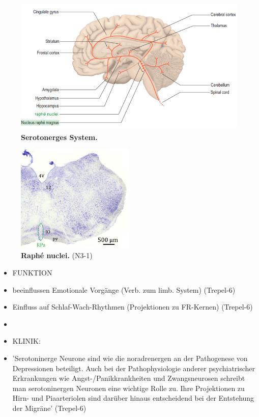 \documentclass[12pt,a4paper,pdftex]{article}
\begin{document}
\begin{figure}[H]
    \centering
    \includegraphics[width=\textwidth]{pictures/Bilder_monoamine_systeme/serotonerges_system.PNG}
    \caption[Serotonerges System]{\textbf{Serotonerges System.} \textsuperscript{\cite[9]{crossman2014neuroanatomy}}}
    \label{fig:serotonerges_system}
\end{figure}{}
    
\begin{figure}[H]
    \centering
    \includegraphics[width=0.5\textwidth]{pictures/Bilder_monoamine_systeme/raphe_nuclei.png}
    \caption[Raphé nuclei]{\textbf{Raphé nuclei.} (N3-1)}
    \label{fig:raphe_nuclei}
\end{figure}{}


\begin{itemize}{}
    \item FUNKTION
    \item beeinflussen Emotionale Vorgänge (Verb. zum limb. System) (Trepel-6)
    \item Einfluss auf Schlaf-Wach-Rhythmen (Projektionen zu FR-Kernen) (Trepel-6)
    \item 
    \item KLINIK:
    \item 'Serotoninerge Neurone sind wie die noradrenergen an der Pathogenese von Depressionen beteiligt. Auch bei der Pathophysiologie anderer psychiatrischer Erkrankungen wie Angst-/Panikkrankheiten und Zwangsneurosen schreibt man serotoninergen Neuronen eine wichtige Rolle zu. Ihre Projektionen zu Hirn- und Piaarteriolen sind darüber hinaus entscheidend bei der Entstehung der Migräne' (Trepel-6)
\end{itemize}{}
\end{document}
